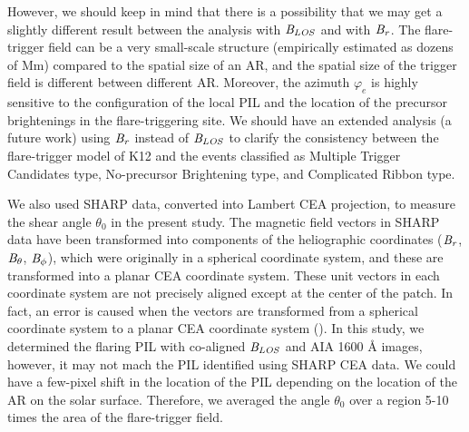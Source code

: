 \documentclass[10pt,preprint2]{aastex}
\begin{document}
However, we should keep in mind that there is a possibility that we may get a slightly different result between the analysis with $\it{B}_{LOS}$ and with $\it{B}_{r}$.
The flare-trigger field can be a very small-scale structure (empirically estimated as dozens of Mm) compared to the spatial size of an AR, and the spatial size of the trigger field is different between different AR.
Moreover, the azimuth $\varphi_{e}$ is highly sensitive to the configuration of the local PIL and the location of the precursor brightenings in the flare-triggering site.
We should have an extended analysis (a future work) using $\it{B}_{r}$ instead of $\it{B}_{LOS}$ to clarify the consistency between the flare-trigger model of K12 and the events classified as Multiple Trigger Candidates type, No-precursor Brightening type, and Complicated Ribbon type.

We also used SHARP data, converted into Lambert CEA projection, to measure the shear angle $\theta_{0}$ in the present study.
The magnetic field vectors in SHARP data have been transformed into components of the heliographic coordinates ($\it{B}_{r}$, $\it{B}_{\theta}$, $\it{B}_{\phi}$), which were originally in a spherical coordinate system, and these are transformed into a planar CEA coordinate system.
These unit vectors in each coordinate system are not precisely aligned except at the center of the patch.
In fact, an error is caused when the vectors are transformed from a spherical coordinate system to a planar CEA coordinate system (\citet{bobra14}).
In this study, we determined the flaring PIL with co-aligned $\it{B}_{LOS}$ and AIA 1600 {\AA} images, however, it may not mach the PIL identified using SHARP CEA data.
We could have a few-pixel shift in the location of the PIL depending on the location of the AR on the solar surface.
Therefore, we averaged the angle $\theta_{0}$ over a region 5-10 times the area of the flare-trigger field.

  
\end{document}
